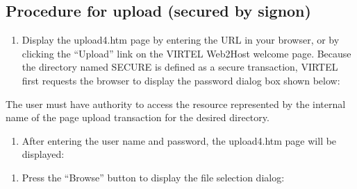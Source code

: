 \documentclass[letterpaper,10pt,english]{sphinxmanual}
\begin{document}
\subsection{Procedure for upload (secured by signon)}
\label{\detokenize{audit_operations_ and_performance:procedure-for-upload-secured-by-signon}}\label{\detokenize{audit_operations_ and_performance:index-58}}\begin{enumerate}
\def\theenumi{\arabic{enumi}}
\def\labelenumi{\theenumi .}
\makeatletter\def\p@enumii{\p@enumi \theenumi .}\makeatother
\item {} 
Display the upload4.htm page by entering the URL  in your browser, or by clicking the “Upload” link on the VIRTEL Web2Host welcome page. Because the directory named SECURE is defined as a secure transaction, VIRTEL first requests the browser to display the password dialog box shown below:

\end{enumerate}



The user must have authority to access the resource represented by the internal name of the page upload transaction for the desired directory.
\begin{enumerate}
\def\theenumi{\arabic{enumi}}
\def\labelenumi{\theenumi .}
\makeatletter\def\p@enumii{\p@enumi \theenumi .}\makeatother
\setcounter{enumi}{1}
\item {} 
After entering the user name and password, the upload4.htm page will be displayed:

\end{enumerate}


\begin{enumerate}
\def\theenumi{\arabic{enumi}}
\def\labelenumi{\theenumi .}
\makeatletter\def\p@enumii{\p@enumi \theenumi .}\makeatother
\setcounter{enumi}{2}
\item {} 
Press the “Browse” button to display the file selection dialog:

\end{enumerate}

\end{document}
